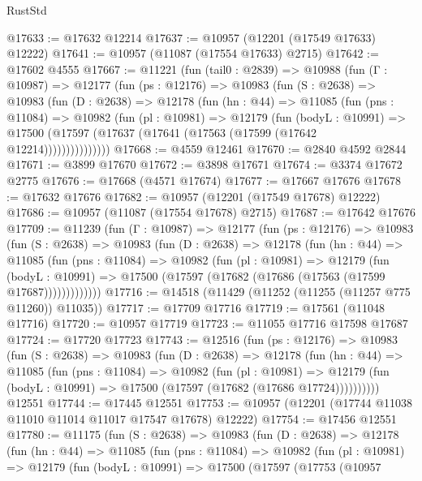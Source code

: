 \begin{lexlean}{RustStd}
\begin{coremodule}
@17633 := @17632 @12214
@17637 := @10957 (@12201 (@17549 @17633) @12222)
@17641 := @10957 (@11087 (@17554 @17633) @2715)
@17642 := @17602 @4555
@17667 := @11221
    (fun (tail0 : @2839) =>
    @10988
      (fun (Γ : @10987) =>
      @12177
        (fun (ps : @12176) =>
        @10983
          (fun (S : @2638) =>
          @10983
            (fun (D : @2638) =>
            @12178
              (fun (hn : @44) =>
              @11085
                (fun (pns : @11084) =>
                @10982
                  (fun (pl : @10981) =>
                  @12179
                    (fun (bodyL : @10991) =>
                    @17500 (@17597 (@17637 (@17641 (@17563 (@17599 (@17642 @12214)))))))))))))))
@17668 := @4559 @12461
@17670 := @2840 @4592 @2844
@17671 := @3899 @17670
@17672 := @3898 @17671
@17674 := @3374 @17672 @2775
@17676 := @17668 (@4571 @17674)
@17677 := @17667 @17676
@17678 := @17632 @17676
@17682 := @10957 (@12201 (@17549 @17678) @12222)
@17686 := @10957 (@11087 (@17554 @17678) @2715)
@17687 := @17642 @17676
@17709 := @11239
    (fun (Γ : @10987) =>
    @12177
      (fun (ps : @12176) =>
      @10983
        (fun (S : @2638) =>
        @10983
          (fun (D : @2638) =>
          @12178
            (fun (hn : @44) =>
            @11085
              (fun (pns : @11084) =>
              @10982
                (fun (pl : @10981) =>
                @12179
                  (fun (bodyL : @10991) =>
                  @17500 (@17597 (@17682 (@17686 (@17563 (@17599 @17687)))))))))))))
@17716 := @14518 (@11429 (@11252 (@11255 (@11257 @775 @11260)) @11035))
@17717 := @17709 @17716
@17719 := @17561 (@11048 @17716)
@17720 := @10957 @17719
@17723 := @11055 @17716 @17598 @17687
@17724 := @17720 @17723
@17743 := @12516
    (fun (ps : @12176) =>
    @10983
      (fun (S : @2638) =>
      @10983
        (fun (D : @2638) =>
        @12178
          (fun (hn : @44) =>
          @11085
            (fun (pns : @11084) =>
            @10982
              (fun (pl : @10981) =>
              @12179 (fun (bodyL : @10991) => @17500 (@17597 (@17682 (@17686 @17724))))))))))
    @12551
@17744 := @17445 @12551
@17753 := @10957 (@12201 (@17744 @11038 @11010 @11014 @11017 @17547 @17678) @12222)
@17754 := @17456 @12551
@17780 := @11175
    (fun (S : @2638) =>
    @10983
      (fun (D : @2638) =>
      @12178
        (fun (hn : @44) =>
        @11085
          (fun (pns : @11084) =>
          @10982
            (fun (pl : @10981) =>
            @12179
              (fun (bodyL : @10991) =>
              @17500
                (@17597
                  (@17753
                    (@10957

\end{coremodule}
\end{lexlean}
